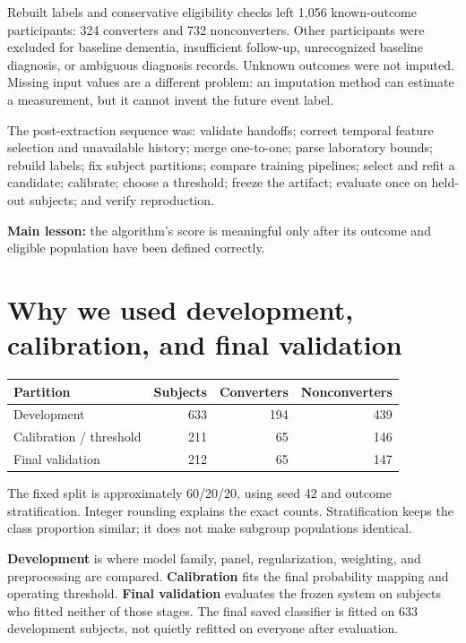 Rebuilt labels and conservative eligibility checks left 1,056 known-outcome participants: 324 converters and 732 nonconverters. Other participants were excluded for baseline dementia, insufficient follow-up, unrecognized baseline diagnosis, or ambiguous diagnosis records. Unknown outcomes were not imputed. Missing input values are a different problem: an imputation method can estimate a measurement, but it cannot invent the future event label.

The post-extraction sequence was: validate handoffs; correct temporal feature selection and unavailable history; merge one-to-one; parse laboratory bounds; rebuild labels; fix subject partitions; compare training pipelines; select and refit a candidate; calibrate; choose a threshold; freeze the artifact; evaluate once on held-out subjects; and verify reproduction.

\textbf{Main lesson:} the algorithm's score is meaningful only after its outcome and eligible population have been defined correctly.
\clearpage

\section{Why we used development, calibration, and final validation}
\begin{center}\begin{tabular}{lrrr}\toprule
Partition & Subjects & Converters & Nonconverters\\\midrule
Development & 633 & 194 & 439\\
Calibration / threshold & 211 & 65 & 146\\
Final validation & 212 & 65 & 147\\\bottomrule
\end{tabular}\end{center}
The fixed split is approximately 60/20/20, using seed 42 and outcome stratification. Integer rounding explains the exact counts. Stratification keeps the class proportion similar; it does not make subgroup populations identical.

\textbf{Development} is where model family, panel, regularization, weighting, and preprocessing are compared. \textbf{Calibration} fits the final probability mapping and operating threshold. \textbf{Final validation} evaluates the frozen system on subjects who fitted neither of those stages. The final saved classifier is fitted on 633 development subjects, not quietly refitted on everyone after evaluation.

